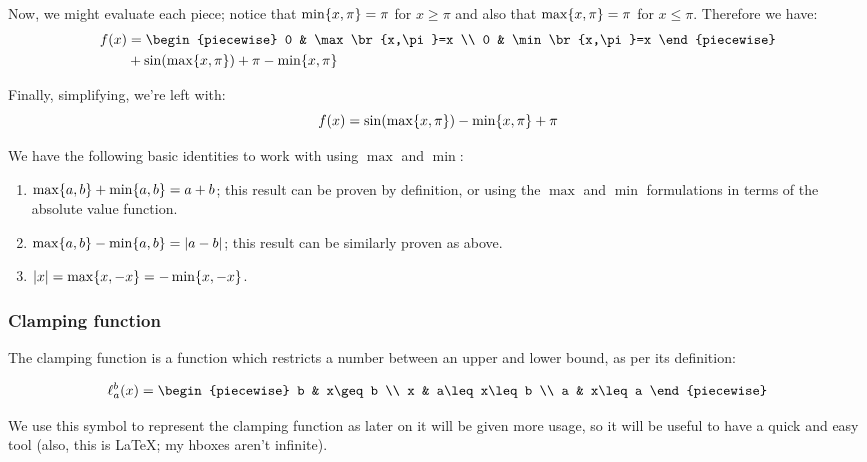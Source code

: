 \begin{example}
    Now, we might evaluate each piece; notice that $\min\{x,\pi\}=\pi$ for $x\geq\pi$ and also that $\max\{x,\pi\}=\pi$ for $x\leq\pi$. Therefore we have:
    \begin{align*}
        f(x) &= \begin{piecewise}
            0 & \max\br{x,\pi}=x \\
            0 & \min\br{x,\pi}=x
        \end{piecewise} \\
        &+\sin(\max\br{x,\pi})+\pi - \min\br{x,\pi}
    \end{align*}

    Finally, simplifying, we're left with:
    $$
        f(x) = \sin(\max\{x,\pi\})-\min\{x,\pi\}+\pi
    $$
\end{example}

\begin{theorem}
    We have the following basic identities to work with using $\max$ and $\min$:
    \begin{enumerate}
        \item $\max\{a,b\}+\min\{a,b\}=a+b$; this result can be proven by definition, or using the $\max$ and $\min$ formulations in terms of the absolute value function.
        \item $\max\{a,b\}-\min\{a,b\}=\abs{a-b}$; this result can be similarly proven as above.
        \item $\abs{x}=\max\{x,-x\}=-\min\{x,-x\}$.
    \end{enumerate}
\end{theorem}

\subsubsection{Clamping function}
\label{section:clamping_function}
The clamping function is a function which restricts a number between an upper and lower bound, as per its definition:

$$
\ell_{a}^{b}(x)=\begin{piecewise}
    b & x\geq b \\
    x & a\leq x\leq b \\
    a & x\leq a
\end{piecewise}
$$

We use this symbol to represent the clamping function as later on it will be given more usage, so it will be useful to have a quick and easy tool (also, this is LaTeX; my hboxes aren't infinite).

